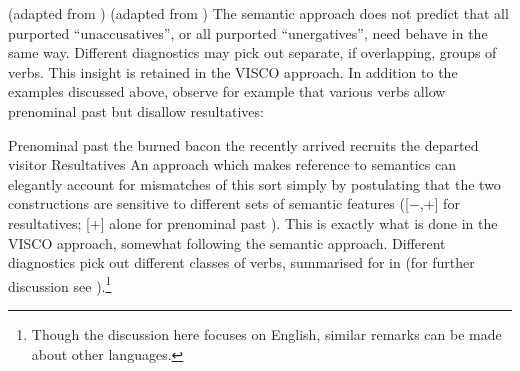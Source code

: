 \documentclass[output=paper]{langsci/langscibook}
\begin{document}
\ea\label{ex:19.35}  (adapted from \citealt[140]{Zaenen1993})
    \z
\ex \label{ex:19.36}  (adapted from \citealt[131]{Zaenen1993})
    \z
\z
The semantic approach does not predict that all purported
\enquote{unaccusatives}, or all purported \enquote{unergatives}, need behave in
the same way. Different diagnostics may pick out separate, if overlapping,
groups of verbs. This insight is retained in the VISCO approach. In addition to
the examples discussed above, observe for example that various verbs allow
prenominal past  but disallow resultatives:\largerpage[-1]

\ea Prenominal past 
    \ea the burned bacon
    \ex the recently arrived recruits
    \ex the departed visitor
    \z
\ex Resultatives
    \z
\z
An approach which makes reference to semantics can elegantly account for
mismatches of this sort simply by postulating that the two constructions are
sensitive to different sets of semantic features ([$-$\Initiation{},+\Change{}] for
resultatives; [$+$\Change{}] alone for prenominal past ). This is
exactly what is done in the VISCO approach, somewhat following the semantic
approach. Different diagnostics pick out different classes of verbs, summarised
for  in  (for further discussion see
\citealt{Baker2018,Baker2019}).\footnote{Though the discussion here focuses on
English, similar remarks can be made about other languages.}\largerpage[-2]
\end{document}
